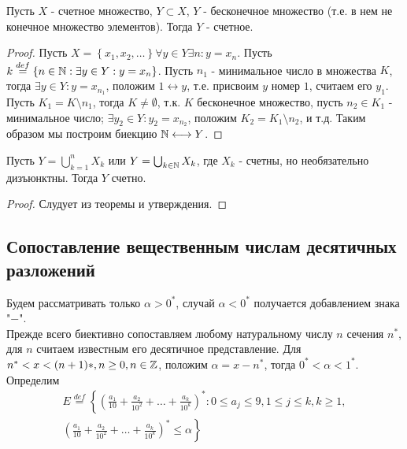 \documentclass[main]{subfiles}
\begin{document}
\begin{assertion}
    Пусть $X$ - счетное множество, $Y \subset X$, $Y$ - бесконечное множество
    (т.е. в нем не конечное множество элементов). Тогда $Y$ - счетное.
\end{assertion}
\begin{proof}
    Пусть $X = \left\{x_1, x_2, \ldots\right\} \forall y \in Y
    \exists n: y = x_n$.
    Пусть $k \overset{def}{=} \left\{n \in \mathbb{N}: \exists y \in Y: y = x_n\right\}$.
    Пусть $n_1$ - минимальное число в множества $K$, тогда $\exists y \in Y:
    y = x_{n_1}$, положим $1 \longleftrightarrow y$, т.е. присвоим $y$ номер $1$,
    считаем его $y_1$. Пусть $K_1 = K \setminus {n_1}$, тогда $K \neq \emptyset$,
    т.к. $K$ бесконечное множество, пусть $n_2 \in K_1$ - минимальное число;
    $\exists y_2 \in Y : y_2 = x_{n_2}$, положим $K_2 = K_1 \setminus {n_2}$,
    и т.д. Таким образом мы построим биекцию $\mathbb{N} \longleftrightarrow Y$.
\end{proof}
\begin{corollary}
    Пусть $Y = \bigcup_{k = 1}^nX_k$ или $Y = \bigcup_{k \in \mathbb{N}}X_k$, где 
    $X_k$ - счетны, но необязательно дизъюнктны. Тогда $Y$ счетно.
\end{corollary}
\begin{proof}
    Слудует из теоремы и утверждения.
\end{proof}

\subsection{Сопоставление вещественным числам десятичных разложений}
Будем рассматривать только $\alpha > 0^*$, случай $\alpha < 0^*$ получается
добавлением знака "$-$". \\
Прежде всего биективно сопоставляем любому натуральному числу $n$ сечения 
$n^*$, для $n$ считаем известным его десятичное представление. Для 
$n^* < x < (n+1)*, n \geq 0, n \in \mathbb{Z}$, положим $\alpha = x - n^*$, тогда
$0^* < \alpha < 1^*$. Определим
\begin{multline*}
    E \overset{def}{=} 
    \left\{ 
        \left( 
            \frac{a_1}{10} + \frac{a_2}{10^2} + \ldots + \frac{a_k}{10^k}
            \right)^* : 0 \leq a_j \leq 9, 1 \leq j \leq k, k \geq 1, \right. \\
        \left. \left(
            \frac{a_1}{10} + \frac{a_2}{10^2} + \ldots + \frac{a_k}{10^k}
        \right)^* \leq \alpha
    \right\}
\end{multline*}
\end{document}
